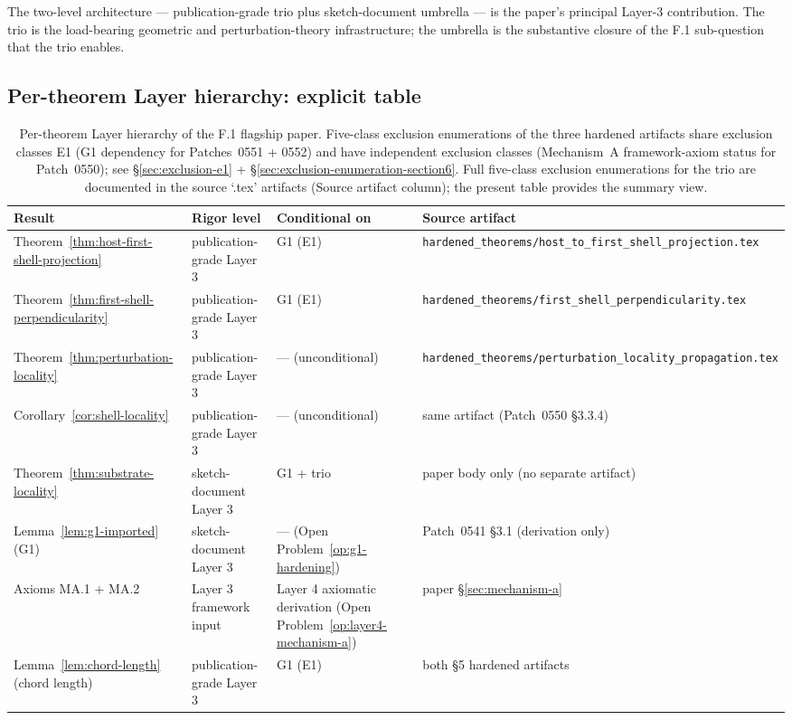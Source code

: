 \documentclass[11pt,letterpaper]{article}
\begin{document}
The two-level architecture --- publication-grade trio plus sketch-document umbrella --- is the paper's principal Layer-3 contribution. The trio is the load-bearing geometric and perturbation-theory infrastructure; the umbrella is the substantive closure of the F.1 sub-question that the trio enables.

\subsection{Per-theorem Layer hierarchy: explicit table}
\label{sec:layer-hierarchy-table}

\begin{table}[h]
\centering
\small
\begin{tabular}{|l|l|l|p{3.5cm}|}
\hline
\textbf{Result} & \textbf{Rigor level} & \textbf{Conditional on} & \textbf{Source artifact} \\
\hline
Theorem~\ref{thm:host-first-shell-projection} & publication-grade Layer 3 & G1 (E1) & \texttt{hardened\_theorems/host\_to\_first\_shell\_projection.tex} \\
\hline
Theorem~\ref{thm:first-shell-perpendicularity} & publication-grade Layer 3 & G1 (E1) & \texttt{hardened\_theorems/first\_shell\_perpendicularity.tex} \\
\hline
Theorem~\ref{thm:perturbation-locality} & publication-grade Layer 3 & --- (unconditional) & \texttt{hardened\_theorems/perturbation\_locality\_propagation.tex} \\
\hline
Corollary~\ref{cor:shell-locality} & publication-grade Layer 3 & --- (unconditional) & same artifact (Patch~0550 \S3.3.4) \\
\hline
Theorem~\ref{thm:substrate-locality} & sketch-document Layer 3 & G1 + trio & paper body only (no separate artifact) \\
\hline
Lemma~\ref{lem:g1-imported} (G1) & sketch-document Layer 3 & --- (Open Problem~\ref{op:g1-hardening}) & Patch~0541 \S3.1 (derivation only) \\
\hline
Axioms MA.1 + MA.2 & Layer 3 framework input & Layer 4 axiomatic derivation (Open Problem~\ref{op:layer4-mechanism-a}) & paper \S\ref{sec:mechanism-a} \\
\hline
Lemma~\ref{lem:chord-length} (chord length) & publication-grade Layer 3 & G1 (E1) & both \S5 hardened artifacts \\
\hline
\end{tabular}
\caption{Per-theorem Layer hierarchy of the F.1 flagship paper. Five-class exclusion enumerations of the three hardened artifacts share exclusion classes E1 (G1 dependency for Patches~0551 + 0552) and have independent exclusion classes (Mechanism~A framework-axiom status for Patch~0550); see \S\ref{sec:exclusion-e1} + \S\ref{sec:exclusion-enumeration-section6}. Full five-class exclusion enumerations for the trio are documented in the source `.tex' artifacts (Source artifact column); the present table provides the summary view.}
\label{tab:layer-hierarchy}
\end{table}
\end{document}
